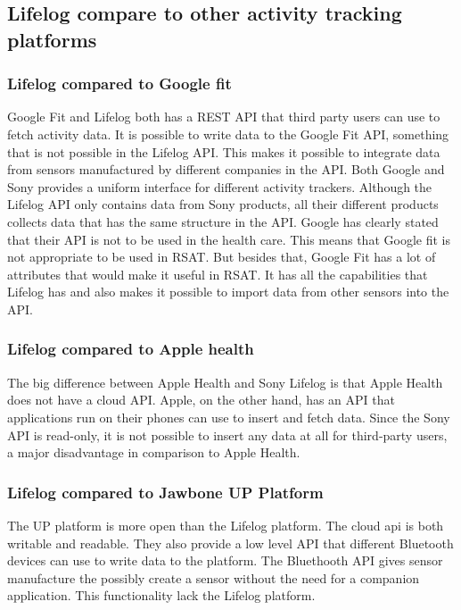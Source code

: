 \documentclass{cslthse-msc}
\begin{document}
\subsection{Lifelog compare to other activity tracking platforms}

\subsubsection{Lifelog compared to Google fit}
Google Fit and Lifelog both has a REST API that third party users can use to fetch activity data. It is possible to write data to the Google Fit API, something that is not possible in the Lifelog API. This makes it possible to integrate data from sensors manufactured by different companies in the API. Both Google and Sony provides a uniform interface for different activity trackers. Although the Lifelog API only contains data from Sony products, all their different products collects data that has the same structure in the API. Google has clearly stated that their API is not to be used in the health care. This means that Google fit is not appropriate to be used in RSAT. But besides that, Google Fit has a lot of attributes that would make it useful in RSAT. It has all the capabilities that Lifelog has and also makes it possible to import data from other sensors into the API. 



\subsubsection{Lifelog compared to Apple health} 

The big difference between Apple Health and Sony Lifelog is that Apple Health does not have a cloud API. Apple, on the other hand, has an API that applications run on their phones can use to insert and fetch data. Since the Sony API is read-only, it is not possible to insert any data at all for third-party users, a major disadvantage in comparison to Apple Health. 

\subsubsection{Lifelog compared to Jawbone UP Platform}

The UP platform is more open than the Lifelog platform. The cloud api is both writable and readable. They also provide a low level API that different Bluetooth devices can use to write data to the platform. The Bluethooth API gives sensor manufacture the possibly create a sensor without the need for a companion application. This functionality lack the Lifelog platform.   
\end{document}
